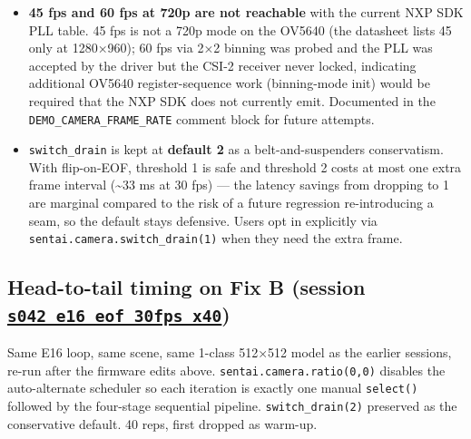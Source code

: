 \begin{itemize}
  hardware rework beyond the scope of this iteration.
\item
  \textbf{45 fps and 60 fps at 720p are not reachable} with the current
  NXP SDK PLL table. 45 fps is not a 720p mode on the OV5640 (the
  datasheet lists 45 only at 1280×960); 60 fps via 2×2 binning was
  probed and the PLL was accepted by the driver but the CSI-2 receiver
  never locked, indicating additional OV5640 register-sequence work
  (binning-mode init) would be required that the NXP SDK does not
  currently emit. Documented in the \texttt{DEMO\_CAMERA\_FRAME\_RATE}
  comment block for future attempts.
\item
  \texttt{switch\_drain} is kept at \textbf{default 2} as a
  belt-and-suspenders conservatism. With flip-on-EOF, threshold 1 is
  safe and threshold 2 costs at most one extra frame interval
  (\textasciitilde33 ms at 30 fps) --- the latency savings from dropping
  to 1 are marginal compared to the risk of a future regression
  re-introducing a seam, so the default stays defensive. Users opt in
  explicitly via \texttt{sentai.camera.switch\_drain(1)} when they need
  the extra frame.
\end{itemize}

\subsection{\texorpdfstring{Head-to-tail timing on Fix B (session
\href{../experiments/s042_e16_eof_30fps_x40/}{\texttt{s042\_e16\_eof\_30fps\_x40}})}{Head-to-tail timing on Fix B (session s042\_e16\_eof\_30fps\_x40)}}\label{head-to-tail-timing-on-fix-b-session-s042_e16_eof_30fps_x40}

Same E16 loop, same scene, same 1-class 512×512 model as the earlier
sessions, re-run after the firmware edits above.
\texttt{sentai.camera.ratio(0,0)} disables the auto-alternate scheduler
so each iteration is exactly one manual \texttt{select()} followed by
the four-stage sequential pipeline. \texttt{switch\_drain(2)} preserved
as the conservative default. 40 reps, first dropped as warm-up.

